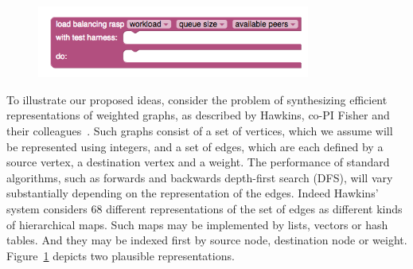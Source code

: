 \begin{figure}[h]
\begin{minipage}{.45\textwidth}
\begin{tikzpicture}[style=g,node distance=0.8cm]
    \end{tikzpicture}
    \label{fig:rep-synth}
  \end{minipage}%
  \hfill{}
  \begin{minipage}{.45\textwidth}
    \centering
    \includegraphics[width=0.8\textwidth]{rasp}
  \end{minipage}
  \hfill{}
  
\end{figure}

To illustrate our proposed ideas, consider the problem of synthesizing
efficient representations of weighted graphs, as described by Hawkins,
co-PI Fisher and their colleagues~\cite{data-rep-synth}.  Such graphs
consist of a set of vertices, which we assume will be represented
using integers, and a set of edges, which are each defined by a source
vertex, a destination vertex and a weight.  The performance of
standard algorithms, such as forwards and backwards depth-first search
(DFS), will vary substantially depending on the representation of the
edges.  Indeed Hawkins' system considers 68 different representations
of the set of edges as different kinds of hierarchical maps.  Such
maps may be implemented by lists, vectors or hash tables.  And they
may be indexed first by source node, destination node or weight.
Figure~\ref{fig:rep-synth} depicts two plausible
representations.

